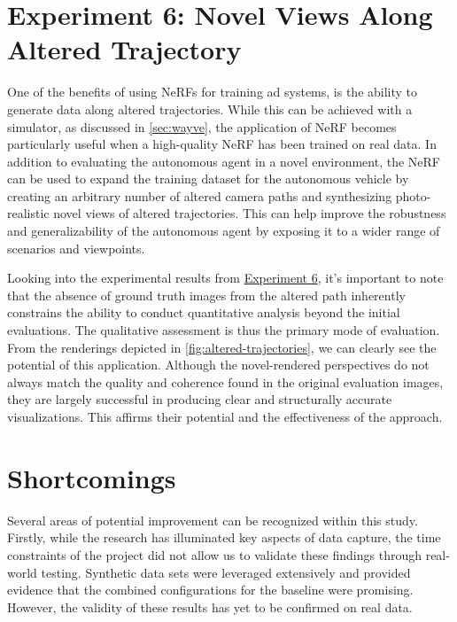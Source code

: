 \begin{comment}
- The estimation could be further improved by investigating techniques for leveraging more of the contained data.
- The NAPLab car's accelerometer could be used to calculate roll and pitch.
- LiDAR data could be used for further pose estimation
\end{comment}





\section{Experiment 6: Novel Views Along Altered Trajectory}
One of the benefits of using NeRFs for training \acrshort{ad} systems, is the ability to generate data along altered trajectories. While this can be achieved with a simulator, as discussed in \autoref{sec:wayve}, the application of NeRF becomes particularly useful when a high-quality NeRF has been trained on real data. In addition to evaluating the autonomous agent in a novel environment, the NeRF can be used to expand the training dataset for the autonomous vehicle by creating an arbitrary number of altered camera paths and synthesizing photo-realistic novel views of altered trajectories. This can help improve the robustness and generalizability of the autonomous agent by exposing it to a wider range of scenarios and viewpoints.

Looking into the experimental results from \hyperref[sec:altered-trajectories]{Experiment 6}, it's important to note that the absence of ground truth images from the altered path inherently constrains the ability to conduct quantitative analysis beyond the initial evaluations. The qualitative assessment is thus the primary mode of evaluation. From the renderings depicted in \autoref{fig:altered-trajectories}, we can clearly see the potential of this application. Although the novel-rendered perspectives do not always match the quality and coherence found in the original evaluation images, they are largely successful in producing clear and structurally accurate visualizations. This affirms their potential and the effectiveness of the approach.



\section{Shortcomings}
Several areas of potential improvement can be recognized within this study. Firstly, while the research has illuminated key aspects of data capture, the time constraints of the project did not allow us to validate these findings through real-world testing. Synthetic data sets were leveraged extensively and provided evidence that the combined configurations for the baseline were promising. However, the validity of these results has yet to be confirmed on real data.

